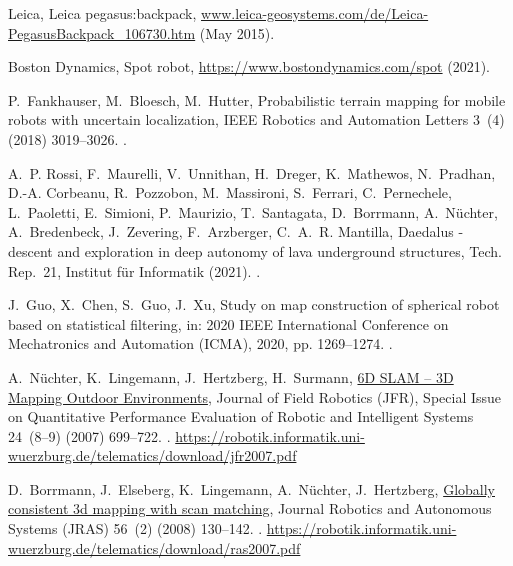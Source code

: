 \documentclass[5p]{elsarticle}
\begin{document}
\begin{thebibliography}{10}
Leica, Leica pegasus:backpack,
  {\small{\url{www.leica-geosystems.com/de/Leica-PegasusBackpack_106730.htm}}}
  ({May} {2015}).

{Boston Dynamics}, Spot robot, \url{https://www.bostondynamics.com/spot}
  (2021).

P.~Fankhauser, M.~Bloesch, M.~Hutter, Probabilistic terrain mapping for mobile
  robots with uncertain localization, IEEE Robotics and Automation Letters
  3~(4) (2018) 3019--3026.
\newblock \href {http://dx.doi.org/10.1109/LRA.2018.2849506}
  {}.

A.~P. Rossi, F.~Maurelli, V.~Unnithan, H.~Dreger, K.~Mathewos, N.~Pradhan,
  D.-A. Corbeanu, R.~Pozzobon, M.~Massironi, S.~Ferrari, C.~Pernechele,
  L.~Paoletti, E.~Simioni, P.~Maurizio, T.~Santagata, D.~Borrmann,
  A.~N{\"u}chter, A.~Bredenbeck, J.~Zevering, F.~Arzberger, C.~A.~R. Mantilla,
  Daedalus - descent and exploration in deep autonomy of lava underground
  structures, Tech. Rep.~21, Institut f{\"u}r Informatik (2021).
\newblock \href {http://dx.doi.org/10.25972/OPUS-22791}
  {}.

J.~Guo, X.~Chen, S.~Guo, J.~Xu, Study on map construction of spherical robot
  based on statistical filtering, in: 2020 IEEE International Conference on
  Mechatronics and Automation (ICMA), 2020, pp. 1269--1274.
\newblock \href {http://dx.doi.org/10.1109/ICMA49215.2020.9233654}
  {}.

A.~N{\"u}chter, K.~Lingemann, J.~Hertzberg, H.~Surmann,
  \href{https://robotik.informatik.uni-wuerzburg.de/telematics/download/jfr2007.pdf}{{6D
  SLAM -- 3D Mapping Outdoor Environments}}, Journal of Field Robotics (JFR),
  Special Issue on Quantitative Performance Evaluation of Robotic and
  Intelligent Systems 24~(8--9) (2007) 699--722.
\newblock \href {http://dx.doi.org/10.1002/rob.20209}
  {}.
\newline\urlprefix\url{https://robotik.informatik.uni-wuerzburg.de/telematics/download/jfr2007.pdf}

D.~Borrmann, J.~Elseberg, K.~Lingemann, A.~N{\"u}chter, J.~Hertzberg,
  \href{https://robotik.informatik.uni-wuerzburg.de/telematics/download/ras2007.pdf}{Globally
  consistent 3d mapping with scan matching}, Journal Robotics and Autonomous
  Systems (JRAS) 56~(2) (2008) 130--142.
\newblock \href {http://dx.doi.org/10.1016/j.robot.2007.07.002}
  {}.
\newline\urlprefix\url{https://robotik.informatik.uni-wuerzburg.de/telematics/download/ras2007.pdf}


\end{thebibliography}
\end{document}
